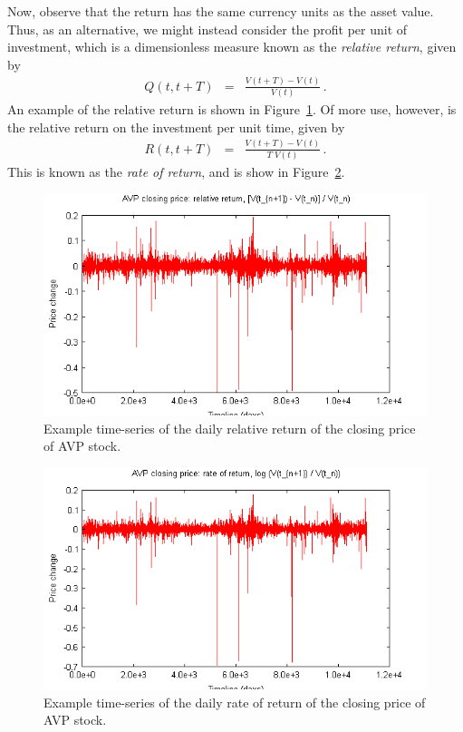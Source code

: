 \documentclass[a4paper]{article}
\begin{document}
Now, observe that the return has the same currency units as
the asset value. Thus, as an alternative, we might instead 
consider the profit per unit of investment, which is
a dimensionless measure 
known as the {\em relative return}, given by
\begin{eqnarray}
  Q(t,t+T) & = & \frac{V(t+T)-V(t)}{V(t)}\,.
\end{eqnarray}
An example of the relative return 
is shown in Figure~\ref{fig:avp-price-simple}.
Of more use, however,  is
the relative return on the investment per unit time, given by
\begin{eqnarray}
  R(t,t+T) & = & \frac{V(t+T)-V(t)}{T\;V(t)}\,.
\end{eqnarray}
This is known as the {\em rate of return}, and
is show in Figure~\ref{fig:avp-price-log}.
\begin{figure}[hbt]
\includegraphics[scale=0.8]{figures/avp-price-close-simple.png}
\caption{Example time-series of the daily relative return of
the closing price of AVP stock.}
\label{fig:avp-price-simple}
\end{figure}
\begin{figure}[hbt]
\includegraphics[scale=0.8]{figures/avp-price-close-log.png}
\caption{Example time-series of the daily rate of return of
the closing price of AVP stock.}
\label{fig:avp-price-log}
\end{figure}
\end{document}
